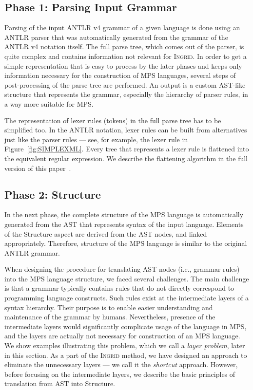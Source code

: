 \subsection{Phase 1: Parsing Input Grammar}

Parsing of the input ANTLR v4 grammar of a given language is done using an ANTLR parser that was automatically generated from the grammar of the ANTLR v4 notation itself.
The full parse tree, which comes out of the parser, is quite complex and contains information not relevant for \textsc{Ingrid}.
In order to get a simple representation that is easy to process by the later phases and keeps only information necessary for the construction of MPS languages, several steps of post-processing of the parse tree are performed.
An output is a custom AST-like structure that represents the grammar, especially the hierarchy of parser rules, in a way more suitable for MPS.

The representation of lexer rules (tokens) in the full parse tree has to be simplified too.
In the ANTLR notation, lexer rules can be built from alternatives just like the parser rules --- see, for example, the lexer rule  in Figure~\ref{fig:SIMPLEXML}.
Every tree that represents a lexer rule is flattened into the equivalent regular expression.
We describe the flattening algorithm in the full version of this paper~\cite{ref:TRFULL}.

\subsection{Phase 2: Structure}

In the next phase, the complete structure of the MPS language is automatically generated from the AST that represents syntax of the input language.
Elements of the Structure aspect are derived from the AST nodes, and linked appropriately.
Therefore, structure of the MPS language is similar to the original ANTLR grammar.

When designing the procedure for translating AST nodes (i.e., grammar rules) into the MPS language structure, we faced several challenges.
The main challenge is that a grammar typically contains rules that do not directly correspond to programming language constructs.
Such rules exist at the intermediate layers of a syntax hierarchy.
Their purpose is to enable easier understanding and maintenance of the grammar by humans.
Nevertheless, presence of the intermediate layers would significantly complicate usage of the language in MPS, and the layers are actually not necessary for construction of an MPS language.
We show examples illustrating this problem, which we call a \emph{layer problem}, later in this section.
As a part of the \textsc{Ingrid} method, we have designed an approach to eliminate the unnecessary layers --- we call it the \emph{shortcut} approach.
However, before focusing on the intermediate layers, we describe the basic principles of translation from AST into Structure.

